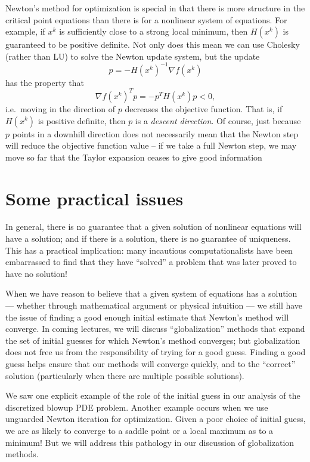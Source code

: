 \documentclass[12pt, leqno]{article} %
\begin{document}
Newton's method for optimization is special in that there is more
structure in the critical point equations than there is for a
nonlinear system of equations.  For example, if $x^k$ is
sufficiently close to a strong local minimum, then $H(x^k)$ is
guaranteed to be positive definite.  Not only does this mean we
can use Cholesky (rather than LU) to solve the Newton update
system, but the update
\[
  p = -H(x^k)^{-1} \nabla f(x^k)
\]
has the property that
\[
  \nabla f(x^k)^T p = -p^T H(x^k) p < 0,
\]
i.e.~moving in the direction of $p$ decreases the objective function.
That is, if $H(x^k)$ is positive definite, then $p$ is a
{\em descent direction}.  Of course, just because $p$ points in a downhill
direction does not necessarily mean that the Newton step will reduce
the objective function value -- if we take a full Newton step, we may
move so far that the Taylor expansion ceases to give good information

\section*{Some practical issues}


In general, there is no guarantee that a given solution of nonlinear
equations will have a solution; and if there is a solution, there is
no guarantee of uniqueness.  This has a practical implication:
many incautious computationalists have been embarrassed to find
that they have ``solved'' a problem that was later proved to have
no solution!

When we have reason to believe that a given system of equations has
a solution --- whether through mathematical argument or physical
intuition --- we still have the issue of finding a good enough initial
estimate that Newton's method will converge.  In coming lectures,
we will discuss ``globalization'' methods that expand the set of
initial guesses for which Newton's method converges; but globalization
does not free us from the responsibility of trying for a good guess.
Finding a good guess helps ensure that our methods will converge
quickly, and to the ``correct'' solution (particularly when there are
multiple possible solutions).

We saw one explicit example of the role of the initial guess in our
analysis of the discretized blowup PDE problem.  Another example
occurs when we use unguarded Newton iteration for optimization.
Given a poor choice of initial guess, we are as likely to converge
to a saddle point or a local maximum as to a minimum!  But we will
address this pathology in our discussion of globalization methods.
\end{document}
